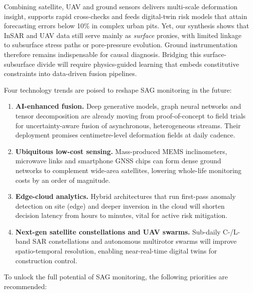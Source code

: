 \documentclass[preprint,11pt,authoryear,3p]{elsarticle}
\begin{document}
Combining satellite, UAV and ground sensors delivers multi-scale deformation insight, supports rapid cross-checks and feeds digital-twin risk models that attain forecasting errors below 10\% in complex urban pits. Yet, our synthesis shows that InSAR and UAV data still serve mainly as \emph{surface} proxies, with limited linkage to subsurface stress paths or pore-pressure evolution.  Ground instrumentation therefore remains indispensable for causal diagnosis.  Bridging this surface-subsurface divide will require physics-guided learning that embeds constitutive constraints into data-driven fusion pipelines.

Four technology trends are poised to reshape SAG monitoring in the future:

\begin{enumerate}
    \item \textbf{AI-enhanced fusion.}  Deep generative models, graph neural networks and tensor decomposition are already moving from proof-of-concept to field trials for uncertainty-aware fusion of asynchronous, heterogeneous streams.  Their deployment promises centimetre-level deformation fields at daily cadence.
    \item \textbf{Ubiquitous low-cost sensing.}  Mass-produced MEMS inclinometers, microwave links and smartphone GNSS chips can form dense ground networks to complement wide-area satellites, lowering whole-life monitoring costs by an order of magnitude.
    \item \textbf{Edge-cloud analytics.}  Hybrid architectures that run first-pass anomaly detection on site (edge) and deeper inversion in the cloud will shorten decision latency from hours to minutes, vital for active risk mitigation.
    \item \textbf{Next-gen satellite constellations and UAV swarms.}  Sub-daily C-/L-band SAR constellations and autonomous multirotor swarms will improve spatio-temporal resolution, enabling near-real-time digital twins for construction control.
\end{enumerate}

To unlock the full potential of SAG monitoring, the following priorities are recommended:
\end{document}
